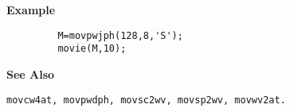{\bf \large \sf Example}
\begin{verbatim}
         M=movpwjph(128,8,'S'); 
         movie(M,10);
\end{verbatim}
\vspace*{.5cm}


{\bf \large \sf See Also}\\
\hspace*{1.5cm}
\begin{minipage}[t]{13.5cm}
\begin{verbatim}
movcw4at, movpwdph, movsc2wv, movsp2wv, movwv2at.
\end{verbatim}
\end{minipage}
